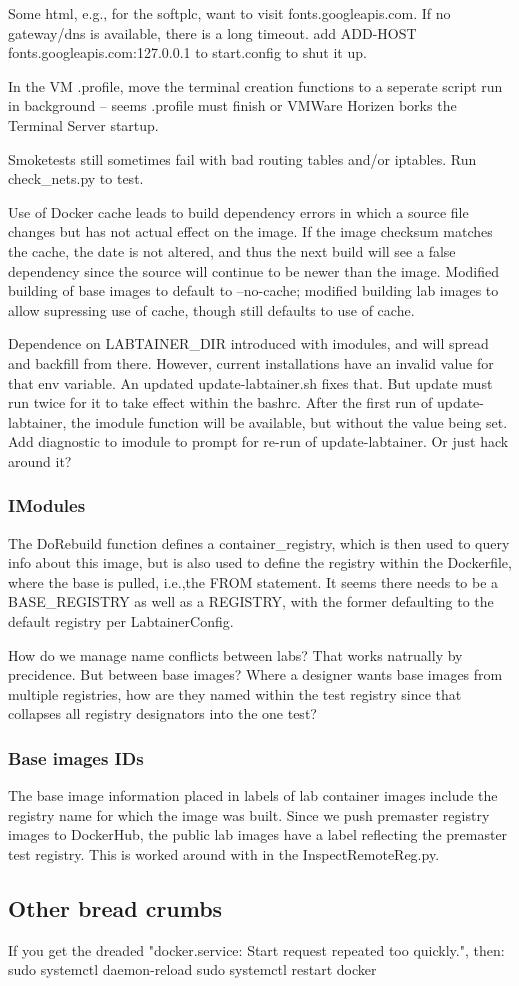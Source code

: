 \documentclass[12pt]{article}
\begin{document}
Some html, e.g., for the softplc, want to visit fonts.googleapis.com.  If no gateway/dns is available, there is a long timeout.
add         ADD-HOST fonts.googleapis.com:127.0.0.1 to start.config to shut it up.

In the VM .profile, move the terminal creation functions to a seperate script run in background -- seems .profile must finish or VMWare Horizen 
borks the Terminal Server startup.

Smoketests still sometimes fail with bad routing tables and/or iptables.  Run check\_nets.py to test.

Use of Docker cache leads to build dependency errors in which a source file changes but has not actual effect on the image.  If the image
checksum matches the cache, the date is not altered, and thus the next build will see a false dependency since the source will continue to
be newer than the image.  Modified building of base images to default to --no-cache; modified building lab images to allow supressing use of cache,
though still defaults to use of cache.

Dependence on LABTAINER\_DIR introduced with imodules, and will spread and backfill from there.  However, current installations have an invalid
value for that env variable.  An updated update-labtainer.sh fixes that.  But update must run twice for it to take effect within the bashrc.
After the first run of update-labtainer, the imodule function will be available, but without the value being set.  Add diagnostic to imodule to
prompt for re-run of update-labtainer.  Or just hack around it?

\subsubsection {IModules}
The DoRebuild function defines a container\_registry, which is then used to query info about this image, but is also used to define the
registry within the Dockerfile, where the base is pulled, i.e.,the FROM statement.  It seems there needs to be a BASE\_REGISTRY as well as
a REGISTRY, with the former defaulting to the default registry per LabtainerConfig.

How do we manage name conflicts between labs?  That works natrually by precidence.  But between base images?  Where a designer wants base
images from multiple registries, how are they named within the test registry since that collapses all registry designators into the one test?

\subsubsection {Base images IDs}
The base image information placed in labels of lab container images include the registry name for which the image was built.  Since we push
premaster registry images to DockerHub, the public lab images have a label reflecting the premaster test registry.
This is worked around with in the InspectRemoteReg.py.  

\subsection{Other bread crumbs}
If you get the dreaded "docker.service: Start request repeated too quickly.", then:
sudo systemctl daemon-reload
sudo systemctl restart docker
\end{document}
